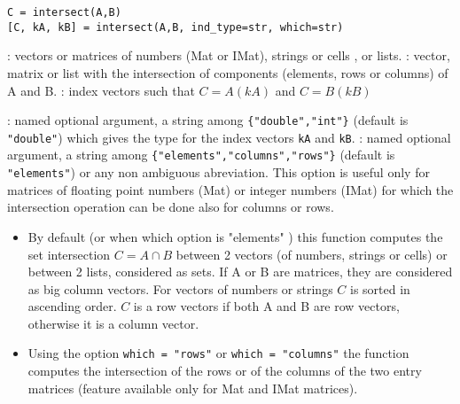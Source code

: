 
\begin{mandesc}
\end{mandesc}

\begin{calling_sequence}
\begin{verbatim}
C = intersect(A,B)
[C, kA, kB] = intersect(A,B, ind_type=str, which=str)
\end{verbatim}
\end{calling_sequence}
\begin{parameters}
  \begin{varlist}
    : vectors or matrices of numbers (Mat or IMat), strings or cells , or lists.
    : vector, matrix or list with the intersection of components (elements, rows or columns) of A and B.
    : index vectors such that $C = A(kA)$ and $C = B(kB)$

    : named optional argument, a string among \verb+{"double","int"}+ (default is \verb+"double"+)
    which gives the type for the index vectors  \verb+kA+ and \verb+kB+. 
    : named optional argument, a string among \verb+{"elements","columns","rows"}+ (default is
    \verb+"elements"+) or any non ambiguous abreviation. This option is useful only for matrices of floating 
       point numbers (Mat) or integer numbers (IMat) for which the intersection operation can be done also for
       columns or rows.
  \end{varlist}
\end{parameters}

\begin{mandescription}
\begin{itemize}
\item  By default (or when which option is "elements" ) this function computes the set 
  intersection $C = A \cap B$
  between 2 vectors (of numbers, strings or cells) or between 2
  lists, considered as sets.  If A or B are matrices, they  are considered as big 
  column vectors. For vectors of numbers or strings $C$ is sorted in ascending order.
  $C$ is a row vectors if both A and B are row vectors, otherwise it is
  a column vector.

\item  Using the option \verb+which = "rows"+ or \verb+which = "columns"+  the function 
  computes the intersection of the rows or of the columns of the two entry 
  matrices (feature available only for Mat and IMat matrices).
\end{itemize}

\end{mandescription}

